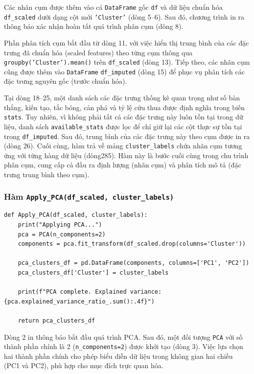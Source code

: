 \documentclass[12pt]{report}
\begin{document}
{Các nhãn cụm được thêm vào cả \texttt{DataFrame} gốc \texttt{df} và dữ liệu chuẩn hóa \texttt{df\_scaled} dưới dạng cột mới \texttt{'Cluster'} (dòng 5–6). Sau đó, chương trình in ra thông báo xác nhận hoàn tất quá trình phân cụm (dòng 8).

Phần phân tích cụm bắt đầu từ dòng 11, với việc hiển thị trung bình của các đặc trưng đã chuẩn hóa (scaled features) theo từng cụm thông qua \texttt{groupby('Cluster').mean()} trên \texttt{df\_scaled} (dòng 13). Tiếp theo, các nhãn cụm cũng được thêm vào \texttt{DataFrame} \texttt{df\_imputed} (dòng 15) để phục vụ phân tích các đặc trưng nguyên gốc (trước chuẩn hóa).

Tại dòng 18–25, một danh sách các đặc trưng thống kê quan trọng như số bàn thắng, kiến tạo, tắc bóng, cản phá và tỷ lệ cứu thua được định nghĩa trong biến \texttt{stats}. Tuy nhiên, vì không phải tất cả các đặc trưng này luôn tồn tại trong dữ liệu, danh sách \texttt{available\_stats} được lọc để chỉ giữ lại các cột thực sự tồn tại trong \texttt{df\_imputed}. Sau đó, trung bình của các đặc trưng này theo cụm được in ra (dòng 26).
Cuối cùng, hàm trả về mảng \texttt{cluster\_labels} chứa nhãn cụm tương ứng với từng hàng dữ liệu (dòng285). Hàm này là bước cuối cùng trong chu trình phân cụm, cung cấp cả đầu ra định lượng (nhãn cụm) và phân tích mô tả (đặc trưng trung bình theo cụm).
\\
\subsubsection{Hàm \texttt{Apply\_PCA(df\_scaled, cluster\_labels)}}
\begin{lstlisting}
def Apply_PCA(df_scaled, cluster_labels):
    print("Applying PCA...")
    pca = PCA(n_components=2)
    components = pca.fit_transform(df_scaled.drop(columns='Cluster'))

    pca_clusters_df = pd.DataFrame(components, columns=['PC1', 'PC2'])
    pca_clusters_df['Cluster'] = cluster_labels

    print(f"PCA complete. Explained variance: {pca.explained_variance_ratio_.sum():.4f}")

    return pca_clusters_df
\end{lstlisting}
Dòng 2 in thông báo bắt đầu quá trình PCA. Sau đó, một đối tượng \texttt{PCA} với số thành phần chính là 2 (\texttt{n\_components=2}) được khởi tạo (dòng 3). Việc lựa chọn hai thành phần chính cho phép biểu diễn dữ liệu trong không gian hai chiều (PC1 và PC2), phù hợp cho mục đích trực quan hóa.

}
\end{document}
